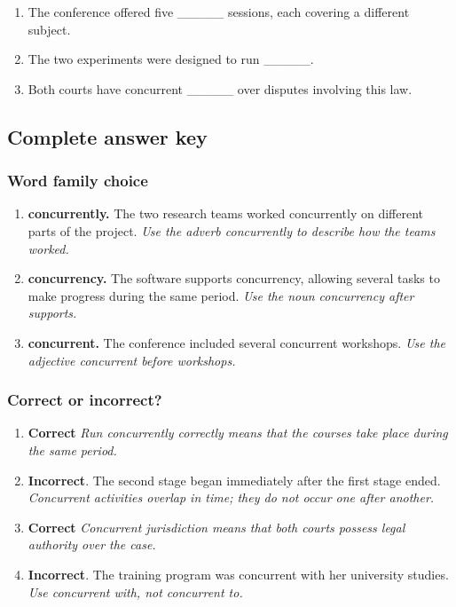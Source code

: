 \documentclass[11pt]{article}
\begin{document}
\begin{enumerate}
  \item The conference offered five \_\_\_\_\_ sessions, each covering a different subject.
  \item The two experiments were designed to run \_\_\_\_\_.
  \item Both courts have concurrent \_\_\_\_\_ over disputes involving this law.
\end{enumerate}

\subsection{Complete answer key}
\subsubsection{Word family choice}
\begin{enumerate}
  \item \textbf{concurrently.} The two research teams worked concurrently on different parts of the project. \emph{Use the adverb concurrently to describe how the teams worked.}
  \item \textbf{concurrency.} The software supports concurrency, allowing several tasks to make progress during the same period. \emph{Use the noun concurrency after supports.}
  \item \textbf{concurrent.} The conference included several concurrent workshops. \emph{Use the adjective concurrent before workshops.}
\end{enumerate}

\subsubsection{Correct or incorrect?}
\begin{enumerate}
  \item \textbf{Correct} \emph{Run concurrently correctly means that the courses take place during the same period.}
  \item \textbf{Incorrect}. The second stage began immediately after the first stage ended. \emph{Concurrent activities overlap in time; they do not occur one after another.}
  \item \textbf{Correct} \emph{Concurrent jurisdiction means that both courts possess legal authority over the case.}
  \item \textbf{Incorrect}. The training program was concurrent with her university studies. \emph{Use concurrent with, not concurrent to.}
\end{enumerate}
\end{document}
